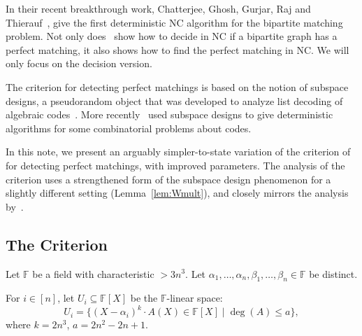 \documentclass{article}
\newcommand{\F}{\mathbb{F}}
\begin{document}


In their recent breakthrough work, Chatterjee, Ghosh, Gurjar, Raj and Thierauf~\cite{CGGRT26}, give the first deterministic NC algorithm for the bipartite matching problem. Not only does~\cite{CGGRT26} show how to decide in NC if a bipartite graph has a perfect matching, it also shows how to find the perfect matching in NC. We will only focus on the decision version. 

The \cite{CGGRT26} criterion for detecting perfect matchings is based on the notion of subspace designs, a pseudorandom object that was developed to analyze list decoding of algebraic codes~\cite{GX13, GK16}. More recently~\cite{BCDZ26} used subspace designs to give deterministic algorithms for some combinatorial problems about codes.

In this note, we present an arguably simpler-to-state variation of the criterion of~\cite{CGGRT26} for detecting perfect matchings, with improved parameters. The analysis of the criterion uses a strengthened form of the subspace design phenomenon for a slightly different setting (Lemma~\ref{lem:Wmult}), and closely mirrors the analysis by~\cite{CGGRT26}. 

\subsection{The Criterion}\label{sec:criterion}
Let $\F$ be a field with characteristic $> 3 n^3$. Let $\alpha_1,\ldots, \alpha_n, \beta_1, \ldots, \beta_n \in \F$ be distinct.



For $i \in [n]$, let $U_i \subseteq \F[X]$ be the $\F$-linear space:
$$ U_i =  \{ (X-\alpha_i)^k \cdot  A(X) \in \F[X] \mid \deg(A) \leq a \},$$
where $ k =  2n^3$, $ a = 2 n^2 - 2n +1$.
\end{document}
